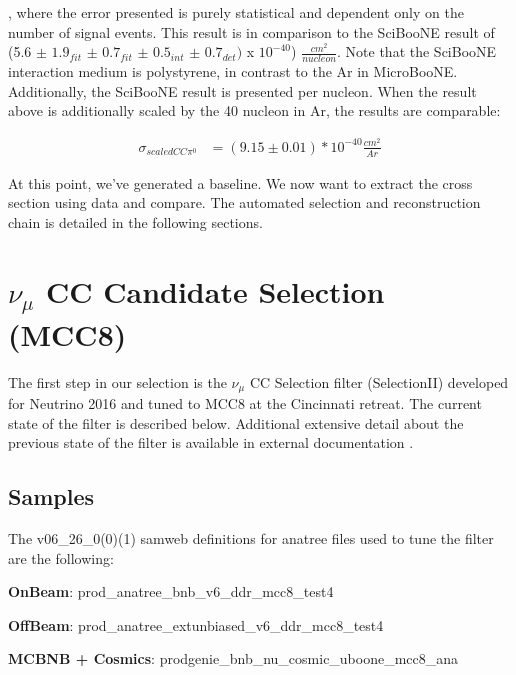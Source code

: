 \documentclass[12pt]{article}
\begin{document}
, where the error presented is purely statistical and dependent only on the number of signal events. This result is in comparison to the SciBooNE result of (5.6 $\pm$ $1.9_{fit}$ $\pm$ $0.7_{fit}$ $\pm$ $0.5_{int}$ $\pm$ $0.7_{det})$ x $10^{-40}$) $\frac{cm^2}{nucleon}$. Note that the SciBooNE interaction medium is polystyrene, in contrast to the Ar in MicroBooNE. Additionally, the SciBooNE result is presented per nucleon.  When the result above is additionally scaled by the 40 nucleon in Ar, the results are comparable:   

\begin{align}
\sigma_{scaled CC\pi^0} &= (9.15 \pm 0.01) *10^{-40} \frac{cm^2}{Ar}
\end{align}

At this point, we've generated a baseline. We now want to extract the cross section using data and compare. The automated selection and reconstruction chain is detailed in the following sections.

\clearpage

\section{$\nu_{\mu}$ CC Candidate Selection (MCC8) }
\par The first step in our selection is the $\nu_\mu$ CC Selection filter (SelectionII) developed for Neutrino 2016 \cite{bib:numucc} and tuned to MCC8 at the Cincinnati retreat. The current state of the filter is described below. Additional extensive detail about the previous state of the filter is available in external documentation \cite{bib:numucc} \cite{bib:6172}. 

\subsection{Samples}
The v06\_26\_0(0)(1) samweb definitions for anatree files used to tune the filter are the following: 

\par \textbf{OnBeam}: prod\_anatree\_bnb\_v6\_ddr\_mcc8\_test4
\par \textbf{OffBeam}: prod\_anatree\_extunbiased\_v6\_ddr\_mcc8\_test4
\par \textbf{MCBNB + Cosmics}: prodgenie\_bnb\_nu\_cosmic\_uboone\_mcc8\_ana
\end{document}

